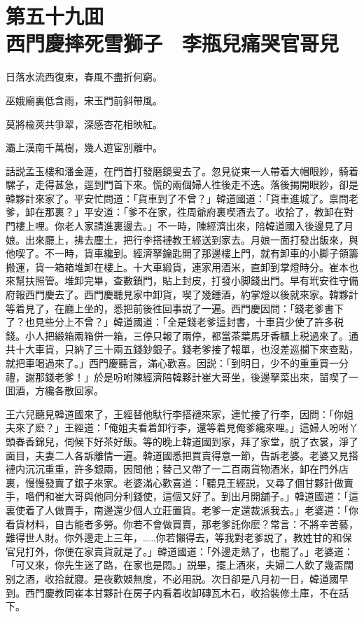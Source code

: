 
\chapter*{第五十九囬　\\西門慶摔死雪獅子　李瓶兒痛哭官哥兒}


\begin{myquote}
日落水流西復東，春風不盡折何窮。

巫娥廟裏低含雨，宋玉門前斜帶風。

莫將楡莢共爭翠，深感杏花相映紅。

灞上漢南千萬樹，幾人遊宦別離中。
\end{myquote}

話説孟玉樓和潘金蓮，在門首打發磨鏡叟去了。忽見従東一人帶着大帽眼紗，騎着騾子，走得甚急，逕到門首下來。慌的兩個婦人徃後走不迭。落後揭開眼紗，卻是韓夥計來家了。平安忙問道：「貨車到了不曾？」韓道國道：「貨車進城了。禀問老爹，卸在那裏？」平安道：「爹不在家，徃周爺府裏喫酒去了。收拾了，教卸在對門樓上哩。你老人家請進裏邊去。」不一時，陳經濟出來，陪韓道國入後邊見了月娘。出來廳上，拂去塵土，把行李搭褳教王經送到家去。月娘一面打發出飯來，與他喫了。不一時，貨車纔到。經濟拏鑰匙開了那邊樓上門，就有卸車的小脚子領籌搬運，貨一箱箱堆卸在樓上。十大車緞貨，連家用酒米，直卸到掌燈時分。崔本也來幫扶照管。堆卸完畢，查數鎖門，貼上封皮，打發小脚錢出門。早有玳安徃守備府報西門慶去了。西門慶聽見家中卸貨，喫了幾鍾酒，約掌燈以後就來家。韓夥計等着見了，在廳上坐的，悉把前後徃回事説了一遍。西門慶因問：「錢老爹書下了？也見些分上不曾？」韓道國道：「全是錢老爹這封書，十車貨少使了許多税錢。小人把緞箱兩箱併一箱，三停只報了兩停，都當茶葉馬牙香櫃上税過來了。通共十大車貨，只納了三十兩五錢鈔銀子。錢老爹接了報單，也沒差巡攔下來查點，就把車喝過來了。」西門慶聽言，滿心歡喜。因説：「到明日，少不的重重買一分禮，謝那錢老爹！」於是吩咐陳經濟陪韓夥計崔大哥坐，後邊拏菜出來，㽞喫了一囬酒，方纔各散回家。

王六兒聽見韓道國來了，王經替他馱行李搭褳來家，連忙接了行李，因問：「你姐夫來了麽？」王經道：「俺姐夫看着卸行李，還等着見俺爹纔來哩。」這婦人吩咐丫頭春香錦兒，伺候下好茶好飯。等的晚上韓道國到家，拜了家堂，脱了衣裳，淨了面目，夫妻二人各訴離情一遍。韓道國悉把買賣得意一節，告訴老婆。老婆又見搭褳内沉沉重重，許多銀兩，因問他；替己又帶了一二百兩貨物酒米，卸在門外店裏，慢慢發賣了銀子來家。老婆滿心歡喜道：「聽見王經説，又尋了個甘夥計做賣手，喒們和崔大哥與他同分利錢使，這個又好了。到出月開舖子。」韓道國道：「這裏使着了人做賣手，南邊還少個人立莊置貨。老爹一定還裁派我去。」老婆道：「你看貨材料，自古能者多勞。你若不會做買賣，那老爹託你麽？常言：不將辛苦藝，難得世人財。你外邊走上三年，……你若懶得去，等我對老爹説了，教姓甘的和保官兒打外，你便在家賣貨就是了。」韓道國道：「外邊走熟了，也罷了。」老婆道：「可又來，你先生迷了路，在家也是悶。」説畢，擺上酒來，夫婦二人飲了幾盃闊别之酒，收拾就寢。是夜歡娛無度，不必用説。次日卻是八月初一日，韓道國早到。西門慶教同崔本甘夥計在房子内看着收卸磚瓦木石，收拾裝修土庫，不在話下。

